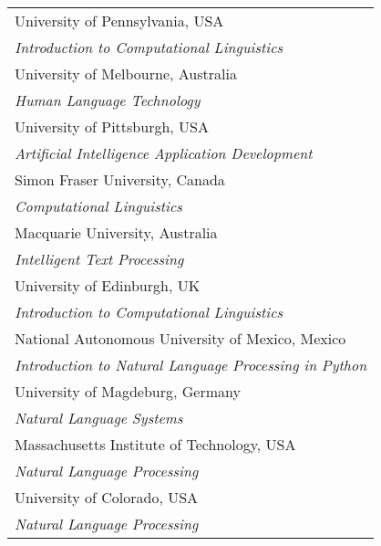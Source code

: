 \documentclass[11pt]{article}
\begin{document}
\begin{table}[bth]
\small\noindent
\begin{boxedminipage}{\linewidth}
\begin{tabular}{l}
University of Pennsylvania, USA \\
\hspace{2ex}
\textit{Introduction to Computational Linguistics} \\[.5ex]

University of Melbourne, Australia \\
\hspace{2ex}
\textit{Human Language Technology} \\[.5ex]

University of Pittsburgh, USA \\
\hspace{2ex}
\textit{Artificial Intelligence Application Development} \\[.5ex]

Simon Fraser University, Canada \\
\hspace{2ex}
\textit{Computational Linguistics} \\[.5ex]

Macquarie University, Australia \\
\hspace{2ex}
\textit{Intelligent Text Processing} \\[.5ex]

University of Edinburgh, UK \\
\hspace{2ex}
\textit{Introduction to Computational Linguistics} \\[.5ex]

National Autonomous University of Mexico, Mexico \\
\hspace{2ex}
\textit{Introduction to Natural Language Processing in Python} \\[.5ex]

University of Magdeburg, Germany \\
\hspace{2ex}
\textit{Natural Language Systems} \\[.5ex]

Massachusetts Institute of Technology, USA \\
\hspace{2ex}
\textit{Natural Language Processing} \\[.5ex]

University of Colorado, USA \\
\hspace{2ex}
\textit{Natural Language Processing} \\[.5ex]


\end{tabular}
\end{boxedminipage}
\end{table}
\end{document}
